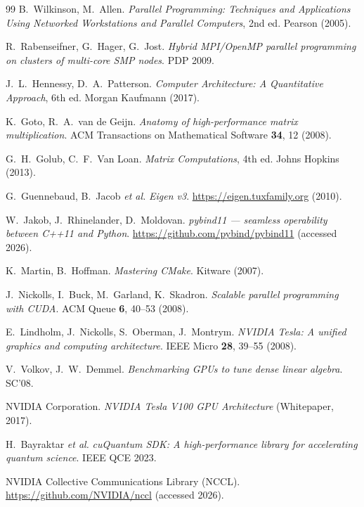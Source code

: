 \documentclass[11pt,a4paper]{article}
\begin{document}
\begin{thebibliography}{99}
  B.~Wilkinson, M.~Allen.
  \textit{Parallel Programming: Techniques and Applications Using Networked
  Workstations and Parallel Computers}, 2nd ed. Pearson (2005).

  R.~Rabenseifner, G.~Hager, G.~Jost.
  \textit{Hybrid MPI/OpenMP parallel programming on clusters of multi-core SMP
  nodes}. PDP 2009.

  J.~L.~Hennessy, D.~A.~Patterson.
  \textit{Computer Architecture: A Quantitative Approach}, 6th ed. Morgan Kaufmann
  (2017).

  K.~Goto, R.~A.~van de Geijn.
  \textit{Anatomy of high-performance matrix multiplication}.
  ACM Transactions on Mathematical Software \textbf{34}, 12 (2008).

  G.~H.~Golub, C.~F.~Van Loan.
  \textit{Matrix Computations}, 4th ed. Johns Hopkins (2013).

  G.~Guennebaud, B.~Jacob \textit{et al.}
  \textit{Eigen v3}. \url{https://eigen.tuxfamily.org} (2010).

  W.~Jakob, J.~Rhinelander, D.~Moldovan.
  \textit{pybind11 --- seamless operability between C++11 and Python}.
  \url{https://github.com/pybind/pybind11} (accessed 2026).

  K.~Martin, B.~Hoffman.
  \textit{Mastering CMake}. Kitware (2007).

  J.~Nickolls, I.~Buck, M.~Garland, K.~Skadron.
  \textit{Scalable parallel programming with CUDA}. ACM Queue \textbf{6}, 40--53 (2008).

  E.~Lindholm, J.~Nickolls, S.~Oberman, J.~Montrym.
  \textit{NVIDIA Tesla: A unified graphics and computing architecture}.
  IEEE Micro \textbf{28}, 39--55 (2008).

  V.~Volkov, J.~W.~Demmel.
  \textit{Benchmarking GPUs to tune dense linear algebra}. SC'08.

  NVIDIA Corporation.
  \textit{NVIDIA Tesla V100 GPU Architecture} (Whitepaper, 2017).

  H.~Bayraktar \textit{et al.}
  \textit{cuQuantum SDK: A high-performance library for accelerating quantum
  science}. IEEE QCE 2023.

  NVIDIA Collective Communications Library (NCCL).
  \url{https://github.com/NVIDIA/nccl} (accessed 2026).


\end{thebibliography}
\end{document}
